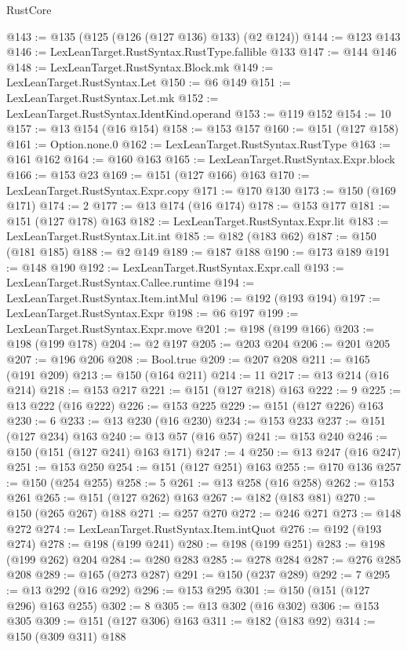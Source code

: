 \begin{lexlean}{RustCore}
\begin{coremodule}
@143 := @135 (@125 (@126 (@127 @136) @133) (@2 @124))
@144 := @123 @143
@146 := LexLeanTarget.RustSyntax.RustType.fallible @133
@147 := @144 @146
@148 := LexLeanTarget.RustSyntax.Block.mk
@149 := LexLeanTarget.RustSyntax.Let
@150 := @6 @149
@151 := LexLeanTarget.RustSyntax.Let.mk
@152 := LexLeanTarget.RustSyntax.IdentKind.operand
@153 := @119 @152
@154 := 10
@157 := @13 @154 (@16 @154)
@158 := @153 @157
@160 := @151 (@127 @158)
@161 := Option.none.{0}
@162 := LexLeanTarget.RustSyntax.RustType
@163 := @161 @162
@164 := @160 @163
@165 := LexLeanTarget.RustSyntax.Expr.block
@166 := @153 @23
@169 := @151 (@127 @166) @163
@170 := LexLeanTarget.RustSyntax.Expr.copy
@171 := @170 @130
@173 := @150 (@169 @171)
@174 := 2
@177 := @13 @174 (@16 @174)
@178 := @153 @177
@181 := @151 (@127 @178) @163
@182 := LexLeanTarget.RustSyntax.Expr.lit
@183 := LexLeanTarget.RustSyntax.Lit.int
@185 := @182 (@183 @62)
@187 := @150 (@181 @185)
@188 := @2 @149
@189 := @187 @188
@190 := @173 @189
@191 := @148 @190
@192 := LexLeanTarget.RustSyntax.Expr.call
@193 := LexLeanTarget.RustSyntax.Callee.runtime
@194 := LexLeanTarget.RustSyntax.Item.intMul
@196 := @192 (@193 @194)
@197 := LexLeanTarget.RustSyntax.Expr
@198 := @6 @197
@199 := LexLeanTarget.RustSyntax.Expr.move
@201 := @198 (@199 @166)
@203 := @198 (@199 @178)
@204 := @2 @197
@205 := @203 @204
@206 := @201 @205
@207 := @196 @206
@208 := Bool.true
@209 := @207 @208
@211 := @165 (@191 @209)
@213 := @150 (@164 @211)
@214 := 11
@217 := @13 @214 (@16 @214)
@218 := @153 @217
@221 := @151 (@127 @218) @163
@222 := 9
@225 := @13 @222 (@16 @222)
@226 := @153 @225
@229 := @151 (@127 @226) @163
@230 := 6
@233 := @13 @230 (@16 @230)
@234 := @153 @233
@237 := @151 (@127 @234) @163
@240 := @13 @57 (@16 @57)
@241 := @153 @240
@246 := @150 (@151 (@127 @241) @163 @171)
@247 := 4
@250 := @13 @247 (@16 @247)
@251 := @153 @250
@254 := @151 (@127 @251) @163
@255 := @170 @136
@257 := @150 (@254 @255)
@258 := 5
@261 := @13 @258 (@16 @258)
@262 := @153 @261
@265 := @151 (@127 @262) @163
@267 := @182 (@183 @81)
@270 := @150 (@265 @267) @188
@271 := @257 @270
@272 := @246 @271
@273 := @148 @272
@274 := LexLeanTarget.RustSyntax.Item.intQuot
@276 := @192 (@193 @274)
@278 := @198 (@199 @241)
@280 := @198 (@199 @251)
@283 := @198 (@199 @262) @204
@284 := @280 @283
@285 := @278 @284
@287 := @276 @285 @208
@289 := @165 (@273 @287)
@291 := @150 (@237 @289)
@292 := 7
@295 := @13 @292 (@16 @292)
@296 := @153 @295
@301 := @150 (@151 (@127 @296) @163 @255)
@302 := 8
@305 := @13 @302 (@16 @302)
@306 := @153 @305
@309 := @151 (@127 @306) @163
@311 := @182 (@183 @92)
@314 := @150 (@309 @311) @188

\end{coremodule}
\end{lexlean}
